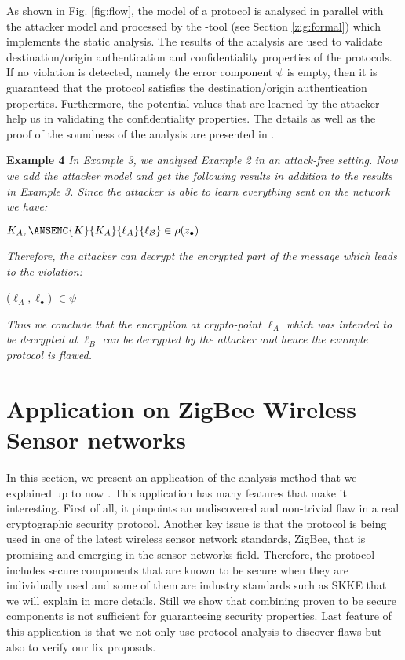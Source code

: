 As shown in Fig. \ref{fig:flow}, the \LYSA model of a protocol is analysed in parallel with the attacker model and processed by the \LYSA-tool (see Section \ref{zig:formal}) which implements the static analysis. 
The results of the analysis are used to validate destination/origin authentication and confidentiality properties of the protocols. 
If no violation is detected, namely the error component $\psi$ is empty, then it is guaranteed that the protocol satisfies the destination/origin authentication properties. 
Furthermore, the potential values that are learned by the attacker help us in validating the confidentiality properties. 
The details as well as the proof of the soundness of the analysis are presented in \cite{bod:2}.

\textbf{Example 4}  \textit{In Example 3, we analysed Example 2 in an attack-free setting. Now we add the attacker model and get the following results in addition to the results in Example 3. Since the attacker is able to learn everything sent on the network we have:}
\begin{center}$K_A,\ANSENC{K}{K_A}{\ell_A}{\mathcal{\ell_B}} \in \rho(z_\bullet)$ \end{center}
\textit{Therefore, the attacker can decrypt the encrypted part of the message which leads to the violation:}
\begin{center}($\ell_A, \ell_\bullet$) $\in \psi$\end{center}
\textit{Thus we conclude that the encryption at crypto-point $\ell_A$ which was intended to be decrypted at $\ell_B$ can be decrypted by the attacker and hence the example protocol is flawed.}
\section{Application on ZigBee Wireless Sensor networks}
In this section, we present an application of the analysis method that
we explained up to now \cite{yuk:nie:2009}. This application has many features that make
it interesting. First of all, it pinpoints an undiscovered and
non-trivial flaw in a
real cryptographic security protocol. Another key issue is that the
protocol is being used in one of the latest wireless sensor network
standards, ZigBee, that is promising and emerging in the sensor
networks field. Therefore, the protocol includes secure components
that are known to be secure when they are individually used and some
of them are industry standards such as SKKE that we will explain in
more details. Still we show that combining proven to be secure
components is not sufficient for guaranteeing security
properties. Last feature of this application is that we not only use
protocol analysis to discover flaws but also to verify our fix
proposals. 

